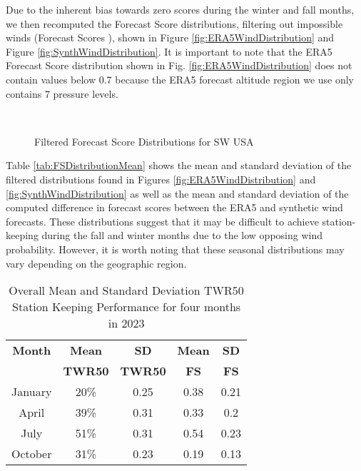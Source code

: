 Due to the inherent bias towards zero scores during the winter and fall months, we then recomputed the Forecast Score distributions, filtering out impossible winds (Forecast Scores ), shown in Figure \ref{fig:ERA5WindDistribution} and Figure \ref{fig:SynthWindDistribution}.  It is important to note that the ERA5 Forecast Score distribution shown in Fig. \ref{fig:ERA5WindDistribution} does not contain values below 0.7 because the ERA5 forecast altitude region we use only contains 7 pressure levels. %

\begin{figure}[!htbp] %
    \centering
    \\
    
    \caption{Filtered Forecast Score Distributions for SW USA}
    \label{fig:windDistributions}
\end{figure}



Table \ref{tab:FSDistributionMean} shows the mean and standard deviation of the filtered distributions found in Figures \ref{fig:ERA5WindDistribution} and \ref{fig:SynthWindDistribution} as well as the mean and standard deviation of the computed difference in forecast scores between the ERA5 and synthetic wind forecasts. These distributions suggest that it may be difficult to achieve station-keeping during the fall and winter months due to the low opposing wind probability. However, it is worth noting that these seasonal distributions may vary depending on the geographic region.

\begin{table}[b]
\renewcommand{\arraystretch}{1.3}
\caption{Overall Mean and Standard Deviation TWR50 Station Keeping Performance for four months in 2023}
\label{tab:overallTWR50}
\centering
\begin{tabular}{|c|c|c|c|c|}
\hline
\bfseries Month   & \bfseries Mean  & \bfseries SD & \bfseries Mean & \bfseries SD \\ 
        & \bfseries TWR50 & \bfseries TWR50   & \bfseries FS   & \bfseries FS \\
\hline
January &  20\%      &  0.25 & 0.38 & 0.21   \\
April   &  39\%      &  0.31 &  0.33 & 0.2  \\
July    &  51\%       &  0.31   & 0.54  & 0.23  \\
October &  31\%         & 0.23   & 0.19  & 0.13 \\ \hline
\end{tabular}%
\end{table}

